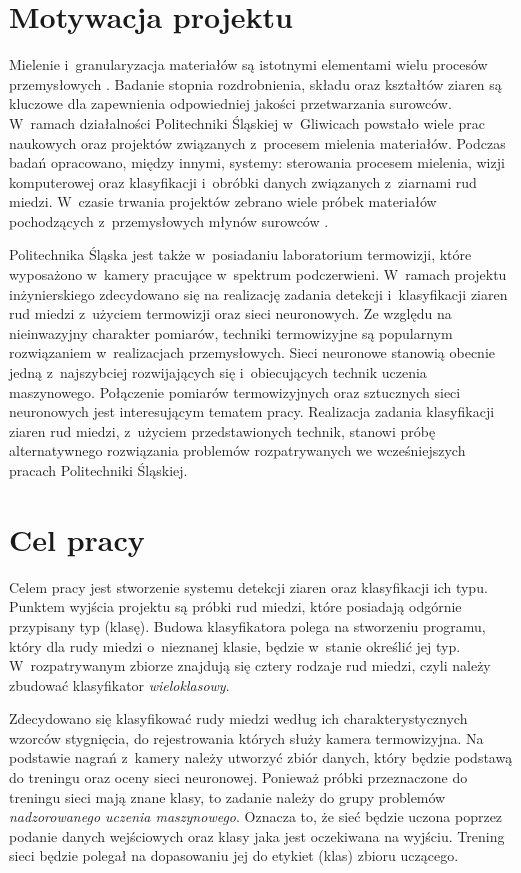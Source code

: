 \section{Motywacja projektu}
Mielenie i~granularyzacja materiałów są istotnymi elementami wielu procesów
przemysłowych \cite{budzan_grains}.
Badanie stopnia rozdrobnienia, składu oraz kształtów ziaren są kluczowe dla
zapewnienia odpowiedniej jakości przetwarzania surowców.
W~ramach działalności Politechniki Śląskiej w~Gliwicach powstało wiele prac
naukowych oraz projektów związanych z~procesem mielenia materiałów.
Podczas badań opracowano, między innymi, systemy: sterowania procesem mielenia,
wizji komputerowej oraz klasyfikacji i~obróbki danych związanych z~ziarnami rud
miedzi.
W~czasie trwania projektów zebrano wiele próbek materiałów pochodzących
z~przemysłowych młynów surowców \cite{budzan_grains, krauze_milling}.

Politechnika Śląska jest także w~posiadaniu laboratorium termowizji, które
wyposażono w~kamery pracujące w~spektrum podczerwieni.
W~ramach projektu inżynierskiego zdecydowano się na realizację zadania detekcji
i~klasyfikacji ziaren rud miedzi z~użyciem termowizji oraz sieci neuronowych.
Ze względu na nieinwazyjny charakter pomiarów, techniki termowizyjne są
popularnym rozwiązaniem w~realizacjach przemysłowych.
Sieci neuronowe stanowią obecnie jedną z~najszybciej rozwijających się
i~obiecujących technik uczenia maszynowego.
Połączenie pomiarów termowizyjnych oraz sztucznych sieci neuronowych jest
interesującym tematem pracy.
Realizacja zadania klasyfikacji ziaren rud miedzi, z~użyciem przedstawionych
technik, stanowi próbę alternatywnego rozwiązania problemów rozpatrywanych we
wcześniejszych pracach Politechniki Śląskiej.

\section{Cel pracy}
Celem pracy jest stworzenie systemu detekcji ziaren oraz klasyfikacji ich typu.
Punktem wyjścia projektu są próbki rud miedzi, które posiadają odgórnie
przypisany typ (klasę).
Budowa klasyfikatora polega na stworzeniu programu, który dla rudy miedzi
o~nieznanej klasie, będzie w~stanie określić jej typ.
W~rozpatrywanym zbiorze znajdują się cztery rodzaje rud miedzi, czyli należy
zbudować klasyfikator \emph{wieloklasowy}.

Zdecydowano się klasyfikować rudy miedzi według ich charakterystycznych wzorców
stygnięcia, do rejestrowania których służy kamera termowizyjna.
Na podstawie nagrań z~kamery należy utworzyć zbiór danych, który będzie podstawą
do treningu oraz oceny sieci neuronowej.
Ponieważ próbki przeznaczone do treningu sieci mają znane klasy, to zadanie
należy do grupy problemów \emph{nadzorowanego uczenia maszynowego}.
Oznacza to, że sieć będzie uczona poprzez podanie danych wejściowych oraz klasy
jaka jest oczekiwana na wyjściu.
Trening sieci będzie polegał na dopasowaniu jej do etykiet (klas) zbioru
uczącego.

